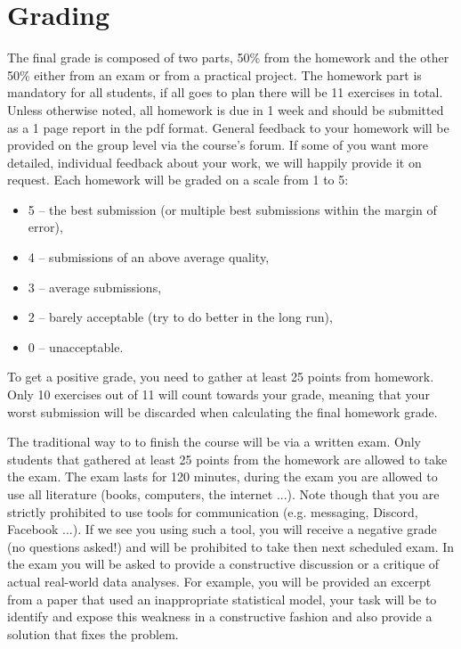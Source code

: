 \documentclass[fleqn,moreauthors,10pt]{ds_report}
\begin{document}
\flushbottom

\maketitle

\thispagestyle{empty} 



\section*{Grading}

The final grade is composed of two parts, 50\% from the homework and the other 50\% either from an exam or from a practical project. The homework part is mandatory for all students, if all goes to plan there will be 11 exercises in total. Unless otherwise noted, all homework is due in 1 week and should be submitted as a 1 page report in the pdf format. General feedback to your homework will be provided on the group level via the course's forum. If some of you want more detailed, individual feedback about your work, we will happily provide it on request. Each homework will be graded on a scale from 1 to 5:

\begin{itemize}
	\item 5 -- the best submission (or multiple best submissions within the margin of error),
	\item 4 -- submissions of an above average quality,
	\item 3 -- average submissions,
	\item 2 -- barely acceptable (try to do better in the long run),
	\item 0 -- unacceptable.
\end{itemize}

To get a positive grade, you need to gather at least 25 points from homework. Only 10 exercises out of 11 will count towards your grade, meaning that your worst submission will be discarded when calculating the final homework grade.

The traditional way to to finish the course will be via a written exam. Only students that gathered at least 25 points from the homework are allowed to take the exam. The exam lasts for 120 minutes, during the exam you are allowed to use all literature (books, computers, the internet ...). Note though that you are strictly prohibited to use tools for communication (e.g. messaging, Discord, Facebook ...). If we see you using such a tool, you will receive a negative grade (no questions asked!) and will be prohibited to take then next scheduled exam. In the exam you will be asked to provide a constructive discussion or a critique of actual real-world data analyses. For example, you will be provided an excerpt from a paper that used an inappropriate statistical model, your task will be to identify and expose this weakness in a constructive fashion and also provide a solution that fixes the problem.
\end{document}
